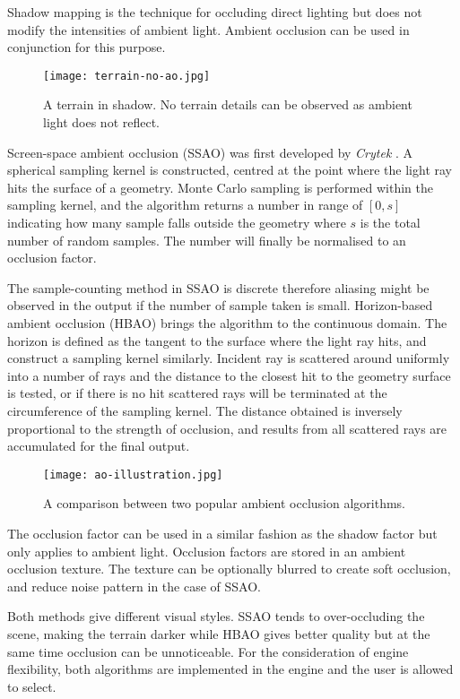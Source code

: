 \documentclass[oneside, a4paper]{report}
\begin{document}
    Shadow mapping is the technique for occluding direct lighting but does not modify the intensities of ambient light. Ambient occlusion can be used in conjunction for this purpose.

    \begin{figure}[H]
        \texttt{[image: terrain-no-ao.jpg]}
        \caption{A terrain in shadow. No terrain details can be observed as ambient light does not reflect.}
        \label{no_ao}
    \end{figure}

    Screen-space ambient occlusion (SSAO) was first developed by \textit{Crytek} \cite{ssao}. A spherical sampling kernel is constructed, centred at the point where the light ray hits the surface of a geometry. Monte Carlo sampling is performed within the sampling kernel, and the algorithm returns a number in range of \([0, s]\) indicating how many sample falls outside the geometry where $s$ is the total number of random samples. The number will finally be normalised to an occlusion factor.

    The sample-counting method in SSAO is discrete therefore aliasing might be observed in the output if the number of sample taken is small. Horizon-based ambient occlusion (HBAO) \cite{hbao} brings the algorithm to the continuous domain. The horizon is defined as the tangent to the surface where the light ray hits, and construct a sampling kernel similarly. Incident ray is scattered around uniformly into a number of rays and the distance to the closest hit to the geometry surface is tested, or if there is no hit scattered rays will be terminated at the circumference of the sampling kernel. The distance obtained is inversely proportional to the strength of occlusion, and results from all scattered rays are accumulated for the final output.

    \begin{figure}[H]
        \texttt{[image: ao-illustration.jpg]}
        \caption{A comparison between two popular ambient occlusion algorithms.}
    \end{figure}

    The occlusion factor can be used in a similar fashion as the shadow factor but only applies to ambient light. Occlusion factors are stored in an ambient occlusion texture. The texture can be optionally blurred to create soft occlusion, and reduce noise pattern in the case of SSAO.

    Both methods give different visual styles. SSAO tends to over-occluding the scene, making the terrain darker while HBAO gives better quality but at the same time occlusion can be unnoticeable. For the consideration of engine flexibility, both algorithms are implemented in the engine and the user is allowed to select.
\end{document}
